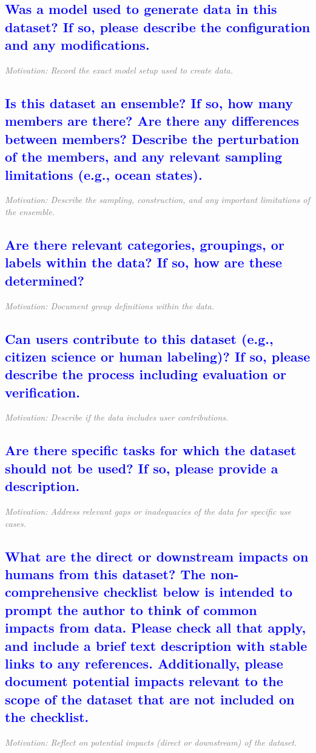 \documentclass[letterpaper, 10 pt, transmag]{IEEEtran}
\begin{document}
\textcolor{blue}{\subsection{Was a model used to generate data in this dataset? If so, please describe the  configuration and any modifications.}}
\textcolor{gray}{\textit{Motivation: Record the exact model setup used to create data.}}

\textcolor{blue}{\subsection{Is this dataset an ensemble? If so, how many members are there? Are there any differences between members? Describe the perturbation of the members, and any relevant sampling limitations (e.g., ocean states).}}
\textcolor{gray}{\textit{Motivation: Describe the sampling, construction, and any important limitations of the ensemble.}}

\textcolor{blue}{\subsection{Are there relevant categories, groupings, or labels within the data? If so, how are these determined?}}
\textcolor{gray}{\textit{Motivation: Document group definitions within the data.}}

\textcolor{blue}{\subsection{Can users contribute to this dataset (e.g., citizen science or human labeling)? If so, please describe the process including evaluation or verification.}}
\textcolor{gray}{\textit{Motivation: Describe if the data includes user contributions.}}

\textcolor{blue}{\subsection{Are there specific tasks for which the dataset should not be used? If so,
please provide a description.}}
\textcolor{gray}{\textit{Motivation: Address relevant gaps or inadequacies of the data for specific use cases.}}

\textcolor{blue}{\subsection{What are the direct or downstream impacts on humans from this dataset? The non-comprehensive checklist below is intended to prompt the author to think of common impacts from data. Please check all that apply, and include a brief text description with stable links to any references. Additionally, please document potential impacts relevant to the scope of the dataset that are not included on the checklist.}}
\textcolor{gray}{\textit{Motivation: Reflect on potential impacts (direct or downstream) of the dataset.}}
\end{document}
